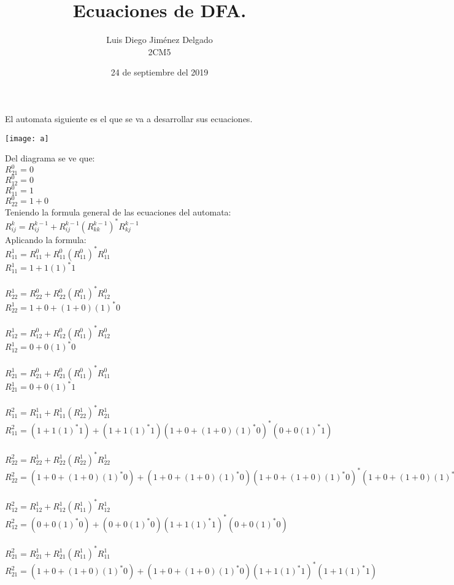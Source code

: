 \documentclass[12pt]{article}
\title{Ecuaciones de DFA.}
\author{Luis Diego Jiménez Delgado\\ 2CM5}
\date{24 de septiembre del 2019}
\begin{document}
    \maketitle
    \newpage
        El automata siguiente es el que se va a desarrollar sus ecuaciones.
        \begin{center}
            \texttt{[image: a]}
        \end{center}
       Del diagrama se ve que:\\
       $R_{21}^{0} = 0 $\\
       $R_{12}^{0} = 0 $\\
       $R_{11}^{0} = 1 $\\
       $R_{22}^{0} = 1+0 $\\
       Teniendo la formula general de las ecuaciones del automata:\\
       $R_{ij}^{k} =  R_{ij}^{k-1}+R_{ij}^{k-1}(R_{kk}^{k-1})^{*}R_{kj}^{k-1}$\\
       Aplicando la formula:\\
       $R_{11}^{1} =  R_{11}^{0}+R_{11}^{0}(R_{11}^{0})^{*}R_{11}^{0}$\\
       $R_{11}^{1} =  1+1(1)^{*}1$\\\\
       $R_{22}^{1} =  R_{22}^{0}+R_{22}^{0}(R_{11}^{0})^{*}R_{12}^{0}$\\
       $R_{22}^{1} =  1+0 +(1+0)(1)^{*}0$\\\\
       $R_{12}^{1} =  R_{12}^{0}+R_{12}^{0}(R_{11}^{0})^{*}R_{12}^{0}$\\
       $R_{12}^{1} =  0+0(1)^{*}0$\\\\
       $R_{21}^{1} =  R_{21}^{0}+R_{21}^{0}(R_{11}^{0})^{*}R_{11}^{0}$\\
       $R_{21}^{1} =  0+0(1)^{*}1$\\\\
       $R_{11}^{2} =  R_{11}^{1}+R_{11}^{1}(R_{22}^{1})^{*}R_{21}^{1}$\\
       $R_{11}^{2} =  (1+1(1)^{*}1)+(1+1(1)^{*}1)(1+0 +(1+0)(1)^{*}0)^{*}(0+0(1)^{*}1)$\\\\
       $R_{22}^{2} =  R_{22}^{1}+R_{22}^{1}(R_{22}^{1})^{*}R_{22}^{1}$\\
       $R_{22}^{2} =  (1+0 +(1+0)(1)^{*}0)+(1+0 +(1+0)(1)^{*}0)(1+0 +(1+0)(1)^{*}0)^{*}(1+0 +(1+0)(1)^{*}0)$\\\\
       $R_{12}^{2} =  R_{12}^{1}+R_{12}^{1}(R_{11}^{1})^{*}R_{12}^{1}$\\
       $R_{12}^{2} =  (0+0(1)^{*}0)+(0+0(1)^{*}0)(1+1(1)^{*}1)^{*}(0+0(1)^{*}0)$\\\\
       $R_{21}^{2} =  R_{21}^{1}+R_{21}^{1}(R_{11}^{1})^{*}R_{11}^{1}$\\
       $R_{21}^{2} =  (1+0 +(1+0)(1)^{*}0)+(1+0 +(1+0)(1)^{*}0)(1+1(1)^{*}1)^{*}(1+1(1)^{*}1)$\\\\
\end{document}
